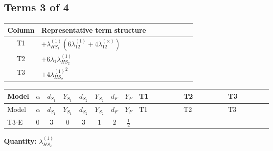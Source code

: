 \documentclass[8pt]{article}
\begin{document}
\begin{landscape}
\subsection*{Terms 3 of 4}
\begin{center}
\begin{tabular}{@{}c >{\raggedright\arraybackslash}p{0.82\linewidth}@{}}
\toprule
Column & Representative term structure \\
\midrule
T1 & \(\displaystyle +{\lambda_{HS_1}^{(1)}} (6 {\lambda_{12}^{(1)}}+4 {\lambda_{12}^{(\times)}})\) \\
\midrule
T2 & \(\displaystyle +6 {\lambda_1} {\lambda_{HS_2}^{(1)}}\) \\
\midrule
T3 & \(\displaystyle +4 {\lambda_{HS_2}^{(1)}}^2\) \\
\midrule
\bottomrule
\end{tabular}
\end{center}
\smallskip
\tiny
\begin{longtable}{@{}llcccccc >{\raggedright\arraybackslash}p{0.21\linewidth} >{\raggedright\arraybackslash}p{0.21\linewidth} >{\raggedright\arraybackslash}p{0.21\linewidth}@{}}
\toprule
Model & $\alpha$ & $d_{S_1}$ & $Y_{S_1}$ & $d_{S_2}$ & $Y_{S_2}$ & $d_F$ & $Y_F$ & T1 & T2 & T3 \\
\midrule
\endfirsthead
\toprule
Model & $\alpha$ & $d_{S_1}$ & $Y_{S_1}$ & $d_{S_2}$ & $Y_{S_2}$ & $d_F$ & $Y_F$ & T1 & T2 & T3 \\
\midrule
\endhead
T3-E & $0$ & $3$ & $0$ & $3$ & $1$ & $2$ & $\frac{1}{2}$ & \scriptsize\adjustbox{max width=\linewidth}{$\begin{gathered} +{\lambda_{HS_1}^{(1)}} (6 {\lambda_{12}^{(1)}}+4 {\lambda_{12}^{(\times)}})\end{gathered}$} & \scriptsize\adjustbox{max width=\linewidth}{$\begin{gathered} +6 {\lambda_1} {\lambda_{HS_2}^{(1)}}\end{gathered}$} & \scriptsize\adjustbox{max width=\linewidth}{$\begin{gathered} +4 {\lambda_{HS_2}^{(1)}}^2\end{gathered}$} \\
\midrule
\bottomrule
\end{longtable}
\clearpage
\noindent\textbf{Quantity: }$\lambda_{HS_2}^{(1)}$\par\smallskip

\end{landscape}
\end{document}
